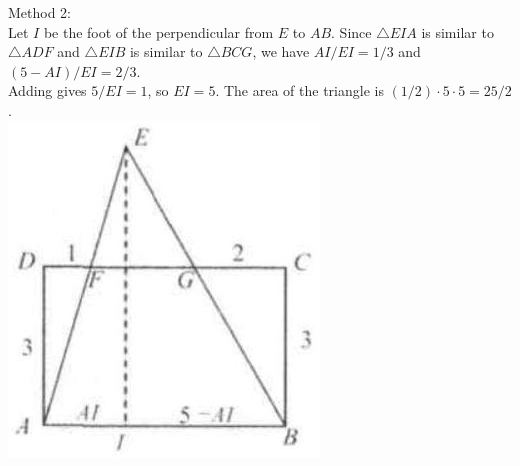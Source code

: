 \documentclass{article}
\begin{document}
Method 2:\\
Let \(I\) be the foot of the perpendicular from \(E\) to \(A B\). Since \(\triangle E I A\) is similar to \(\triangle A D F\) and \(\triangle E I B\) is similar to \(\triangle B C G\), we have \(A I / E I=1 / 3\) and \((5-A I) / E I=2 / 3\).\\
Adding gives \(5 / E I=1\), so \(E I=5\). The area of the triangle is \((1 / 2) \cdot 5 \cdot 5=25 / 2\).\\
\centering
\includegraphics[width=\textwidth]{images/093(1).jpg}
\end{document}

